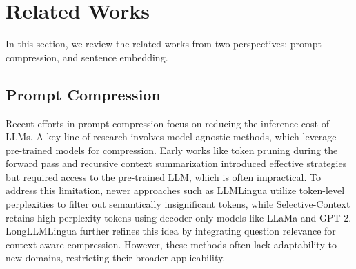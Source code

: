 \section{Related Works}
In this section, we review the related works from two perspectives: prompt compression, and sentence embedding. 

\subsection{Prompt Compression}

Recent efforts in prompt compression focus on reducing the inference cost of LLMs. A key line of research involves model-agnostic methods, which leverage pre-trained models for compression. Early works like token pruning during the forward pass \citep{kim2022learned} and recursive context summarization \citep{chenwalking} introduced effective strategies but required access to the pre-trained LLM, which is often impractical. To address this limitation, newer approaches such as LLMLingua \citep{jiangllmlingua} utilize token-level perplexities to filter out semantically insignificant tokens, while Selective-Context \citep{li2023compressing} retains high-perplexity tokens using decoder-only models like LLaMa and GPT-2. LongLLMLingua \citep{jiang2023longllmlingua} further refines this idea by integrating question relevance for context-aware compression. However, these methods often lack adaptability to new domains, restricting their broader applicability.


